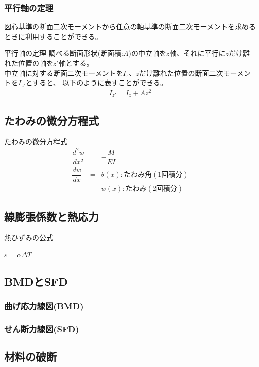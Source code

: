 \documentclass[a4paper]{jsarticle}
\begin{document}
\subsubsection{平行軸の定理}
図心基準の断面二次モーメントから任意の軸基準の断面二次モーメントを求めるときに利用することができる。
\begin{itembox}[l]{平行軸の定理}
    調べる断面形状(断面積:$A$)の中立軸を$z$軸、それに平行に$z$だけ離れた位置の軸を$z'$軸とする。\\
    中立軸に対する断面二次モーメントを$I_z$、$z$だけ離れた位置の断面二次モーメントを$I_{z'}$とすると、
    以下のように表すことができる。
    \begin{eqnarray*}
        I_{z'}=I_z+Az^2
    \end{eqnarray*}
\end{itembox}
\subsection{たわみの微分方程式}
\begin{itembox}[l]{たわみの微分方程式}
    \begin{eqnarray*}
        \dfrac{d^2w}{dx^2}&=&-\dfrac{M}{EI}\\
        \dfrac{dw}{dx}&=&\theta\left(x\right):たわみ角 (1回積分)\\
        &&w\left(x\right):たわみ(2回積分)
    \end{eqnarray*}
\end{itembox}
\subsection{線膨張係数と熱応力}
\begin{itembox}[l]{熱ひずみの公式}
    \begin{center}
        $\varepsilon=\alpha\Delta T$
    \end{center}
\end{itembox}
\subsection{BMDとSFD}
\subsubsection{曲げ応力線図(BMD)}
\subsubsection{せん断力線図(SFD)}
\subsection{材料の破断}
\end{document}

